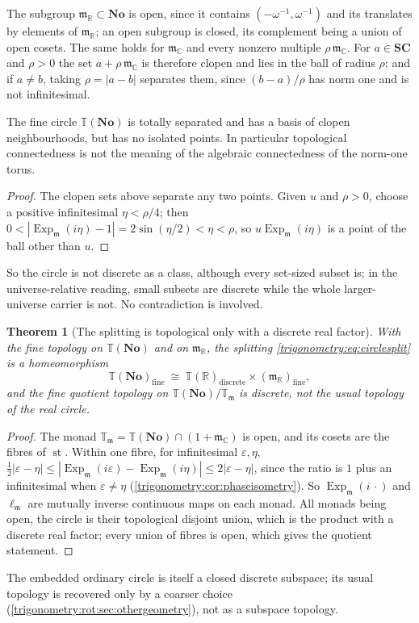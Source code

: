 \documentclass[11pt,letterpaper]{article}
\numberwithin{equation}{section}
\newtheorem{theorem}{Theorem}[section]
\theoremstyle{definition}
\theoremstyle{remark}
\newcommand{\No}{\mathbf{No}}
\newcommand{\SC}{\mathbf{SC}}
\newcommand{\R}{\mathbb R}
\newcommand{\C}{\mathbb C}
\newcommand{\mm}{\mathfrak m}
\newcommand{\TT}{\mathbb T}
\newcommand{\eps}{\varepsilon}
\newcommand{\st}{\operatorname{st}}
\newcommand{\Ex}{\operatorname{Exp}_{\mm}}
\newcommand{\ellm}{\ell_{\mm}}
\newcommand{\Tm}{\TT_{\mm}}
\begin{document}
The subgroup $\mm_{\R}\subset\No$ is open, since it contains $(-\omega^{-1},\omega^{-1})$ and its
translates by elements of $\mm_{\R}$; an open subgroup is closed, its complement being a union of open
cosets. The same holds for $\mm_{\C}$ and every nonzero multiple $\rho\,\mm_{\C}$. For $a\in\SC$ and
$\rho>0$ the set $a+\rho\,\mm_{\C}$ is therefore clopen and lies in the ball of radius $\rho$; and if
$a\ne b$, taking $\rho=|a-b|$ separates them, since $(b-a)/\rho$ has norm one and is not
infinitesimal.

\begin{proposition}\label{trigonometry:rot:prop:totalseparated}
The fine circle $\TT(\No)$ is totally separated and has a basis of clopen neighbourhoods, but has no
isolated points. In particular topological connectedness is not the meaning of the algebraic
connectedness of the norm-one torus.
\end{proposition}
\begin{proof}
The clopen sets above separate any two points. Given $u$ and $\rho>0$, choose a positive
infinitesimal $\eta<\rho/4$; then $0<|\Ex(i\eta)-1|=2\sin(\eta/2)<\eta<\rho$, so $u\Ex(i\eta)$ is a
point of the ball other than $u$.
\end{proof}
So the circle is not discrete as a class, although every set-sized subset is; in the
universe-relative reading, small subsets are discrete while the whole larger-universe carrier is not.
No contradiction is involved.

\begin{theorem}[The splitting is topological only with a discrete real factor]
\label{trigonometry:rot:thm:finesplit}
With the fine topology on $\TT(\No)$ and on $\mm_{\R}$, the splitting \cref{trigonometry:eq:circlesplit}
is a homeomorphism
\begin{equation}\label{trigonometry:rot:eq:finesplit}
 \TT(\No)_{\mathrm{fine}}\ \cong\ \TT(\R)_{\mathrm{discrete}}\times(\mm_{\R})_{\mathrm{fine}},
\end{equation}
and the fine quotient topology on $\TT(\No)/\Tm$ is discrete, not the usual topology of the real
circle.
\end{theorem}
\begin{proof}
The monad $\Tm=\TT(\No)\cap(1+\mm_{\C})$ is open, and its cosets are the fibres of $\st$. Within one
fibre, for infinitesimal $\eps,\eta$,
$\tfrac12|\eps-\eta|\le|\Ex(i\eps)-\Ex(i\eta)|\le2|\eps-\eta|$, since the ratio is $1$ plus an
infinitesimal when $\eps\ne\eta$ (\cref{trigonometry:cor:phaseisometry}). So $\Ex(i\,\cdot)$ and
$\ellm$ are mutually inverse continuous maps on each monad. All monads being open, the circle is their
topological disjoint union, which is the product with a discrete real factor; every union of fibres
is open, which gives the quotient statement.
\end{proof}
The embedded ordinary circle is itself a closed discrete subspace; its usual topology is recovered
only by a coarser choice (\cref{trigonometry:rot:sec:othergeometry}), not as a subspace topology.
\end{document}
